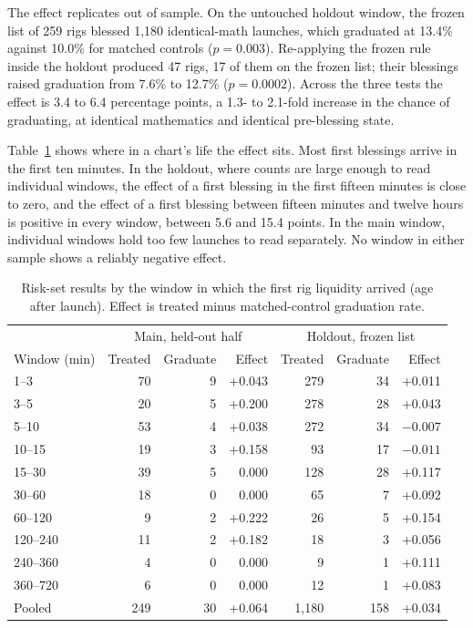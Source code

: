 \documentclass{ledger}
\begin{document}
The effect replicates out of sample. On the untouched holdout window, the frozen list of 259 rigs blessed 1,180 identical-math launches, which graduated at 13.4\% against 10.0\% for matched controls ($p = 0.003$). Re-applying the frozen rule inside the holdout produced 47 rigs, 17 of them on the frozen list; their blessings raised graduation from 7.6\% to 12.7\% ($p = 0.0002$). Across the three tests the effect is 3.4 to 6.4 percentage points, a 1.3- to 2.1-fold increase in the chance of graduating, at identical mathematics and identical pre-blessing state.

Table~\ref{tab:windows} shows where in a chart's life the effect sits. Most first blessings arrive in the first ten minutes. In the holdout, where counts are large enough to read individual windows, the effect of a first blessing in the first fifteen minutes is close to zero, and the effect of a first blessing between fifteen minutes and twelve hours is positive in every window, between 5.6 and 15.4 points. In the main window, individual windows hold too few launches to read separately. No window in either sample shows a reliably negative effect.

\begin{table}[h]
\centering\footnotesize
\caption{Risk-set results by the window in which the first rig liquidity arrived (age after launch). Effect is treated minus matched-control graduation rate.}\label{tab:windows}
\begin{tabular}{@{}lrrrrrr@{}}
\toprule
 & \multicolumn{3}{c}{Main, held-out half} & \multicolumn{3}{c}{Holdout, frozen list} \\
Window (min) & Treated & Graduate & Effect & Treated & Graduate & Effect \\
\midrule
1--3 & 70 & 9 & +0.043 & 279 & 34 & +0.011 \\
3--5 & 20 & 5 & +0.200 & 278 & 28 & +0.043 \\
5--10 & 53 & 4 & +0.038 & 272 & 34 & $-0.007$ \\
10--15 & 19 & 3 & +0.158 & 93 & 17 & $-0.011$ \\
15--30 & 39 & 5 & 0.000 & 128 & 28 & +0.117 \\
30--60 & 18 & 0 & 0.000 & 65 & 7 & +0.092 \\
60--120 & 9 & 2 & +0.222 & 26 & 5 & +0.154 \\
120--240 & 11 & 2 & +0.182 & 18 & 3 & +0.056 \\
240--360 & 4 & 0 & 0.000 & 9 & 1 & +0.111 \\
360--720 & 6 & 0 & 0.000 & 12 & 1 & +0.083 \\
\midrule
Pooled & 249 & 30 & +0.064 & 1,180 & 158 & +0.034 \\
\bottomrule
\end{tabular}
\end{table}
\end{document}
